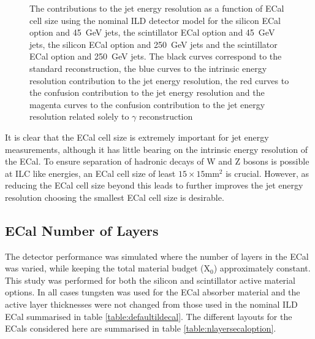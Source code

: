 \begin{figure}[h!]
\caption[The contributions to the jet energy resolution as a function of ECal cell size using the nominal ILD detector model for \protect{} the silicon ECal option and 45~GeV jets, \protect{} the scintillator ECal option and 45~GeV jets, \protect{} the silicon ECal option and 250~GeV jets and \protect{} the scintillator ECal option and 250~GeV jets.  The black curves correspond to the standard reconstruction, the blue curves to the intrinsic energy resolution contribution to the jet energy resolution, the red curves to the confusion contribution to the jet energy resolution and the magenta curves to the confusion contribution to the jet energy resolution related solely to $\gamma$ reconstruction.]{The contributions to the jet energy resolution as a function of ECal cell size using the nominal ILD detector model for \protect{} the silicon ECal option and 45~GeV jets, \protect{} the scintillator ECal option and 45~GeV jets, \protect{} the silicon ECal option and 250~GeV jets and \protect{} the scintillator ECal option and 250~GeV jets.  The black curves correspond to the standard reconstruction, the blue curves to the intrinsic energy resolution contribution to the jet energy resolution, the red curves to the confusion contribution to the jet energy resolution and the magenta curves to the confusion contribution to the jet energy resolution related solely to $\gamma$ reconstruction}
\label{fig:ecalcellsizebreak}
\end{figure}

It is clear that the ECal cell size is extremely important for jet energy measurements, although it has little bearing on the intrinsic energy resolution of the ECal.  To ensure separation of hadronic decays of W and Z bosons is possible at ILC like energies, an ECal cell size of least $15 \times 15 \text{mm}^{2}$ is crucial.  However, as reducing the ECal cell size beyond this leads to further improves the jet energy resolution choosing the smallest ECal cell size is desirable.


\subsection{ECal Number of Layers} 
\label{sec:ecalnlayers}
The detector performance was simulated where the number of layers in the ECal was varied, while keeping the total material budget ($\text{X}_{0}$) approximately constant.  This study was performed for both the silicon and scintillator active material options.  In all cases tungsten was used for the ECal absorber material and the active layer thicknesses were not changed from those used in the nominal ILD ECal summarised in table \ref{table:defaultildecal}.  The different layouts for the ECals considered here are summarised in table \ref{table:nlayersecaloption}.  

